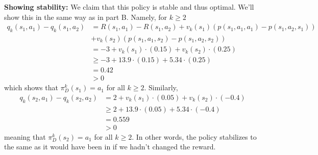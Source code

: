 \documentclass{article}
\begin{document}
\textbf{Showing stability:} We claim that this policy is stable and thus optimal. We'll show this in the same way as in part B. Namely, for $k\geq 2$
\begin{align*}
	q_k(s_1, a_1) - q_k(s_1, a_2) &= R(s_1, a_1) - R(s_1, a_2) + v_k(s_1)(p(s_1, a_1, a_1) - p(s_1, a_2, s_1))\\
	&+ v_k(s_2)(p(s_1, a_1, s_2) - p(s_1, a_2, s_2))\\
	&= -3 + v_k(s_1)\cdot(0.15) + v_k(s_2)\cdot(0.25)\\
	&\geq -3 + 13.9\cdot (0.15) + 5.34 \cdot (0.25)\\
	&= 0.42\\
	&>0
\end{align*}
which shows that $\pi_D^k(s_1) = a_1$ for all $k\geq 2$. Similarly,
\begin{align*}
	q_k(s_2, a_1) - q_k(s_2, a_2) &= 2 + v_k(s_1)\cdot(0.05) + v_k(s_2)\cdot(-0.4)\\
	&\geq 2 + 13.9\cdot(0.05) + 5.34\cdot(-0.4)\\
	&= 0.559\\
	&>0
\end{align*}
meaning that $\pi_D^k(s_2) = a_1$ for all $k\geq 2$. In other words, the policy stabilizes to the same as it would have been in if we hadn't changed the reward. 
\end{document}
